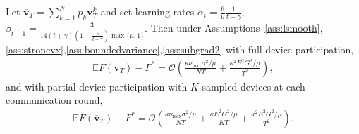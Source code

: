 

\begin{thm}
	Let $\overline{\mathbf{v}}_{T}=\sum_{k=1}^{N}p_{k}\mathbf{v}_{T}^{k}$
	and set learning rates $\alpha_{t}=\frac{6}{\mu}\frac{1}{t+\gamma}$,  $\beta_{t-1}=\frac{3}{14(t+\gamma)(1-\frac{6}{t+\gamma})\max\{\mu,1\}}$. Then under Assumptions~\ref{ass:lsmooth},\ref{ass:stroncvx},\ref{ass:boundedvariance},\ref{ass:subgrad2} with full device participation, 
	\begin{align*}
	\mathbb{E}F(\overline{\mathbf{v}}_{T})-F^{\ast}=\mathcal{O}\left(\frac{\kappa\nu_{\max}\sigma^{2}/\mu}{NT}+\frac{\kappa^{2}E^{2}G^{2}/\mu}{T^{2}}\right),
	\end{align*}
	and with partial device participation with $K$ sampled devices at
	each communication round, 
	\begin{align*}
	\mathbb{E}F(\overline{\mathbf{v}}_{T})-F^{\ast}=\mathcal{O}\left(\frac{\kappa\nu_{\max}\sigma^{2}/\mu}{NT}+\frac{\kappa E^{2}G^{2}/\mu}{KT}+\frac{\kappa^{2}E^{2}G^{2}/\mu}{T^{2}}\right).
	\end{align*}
\end{thm}
%
%
\textbf{}%
\begin{comment}
This implies that $E$ canot be chosen $O(T^{\beta})$ for any $\beta>0$
without degrading the performance. This should be checked in experiments,
whether with partial participation if the communication round is set
to scale with $T$, the convergence deteriorates. This is in constrast
with the full participation case, where $E=O(\sqrt{\frac{T}{N}})$
is allowed. \textbf{If we can confirm that full participation allows
linear speedup with $\nu=N\cdot\max_{k}p_{k}\approx1$ and $E=O(\sqrt{\frac{T}{N}})$,
whereas partial participation only allows $E=O(1)$, then this would
an interesting phenomenon that is not reported by previous studies!}

The convergence result implies that with fixed $E$, as long as \$N\$
satisfies \$E=O(\textbackslash sqrt\{T/N\})\$, there is linear speedup.
When \$N\$ exceeds an upper bound, however, linear speedup may fail
to happen, and \$T/N\$ may remain constant, i.e. the number of iterations
required for convergence may increase with \$N\$. 
\end{comment}

